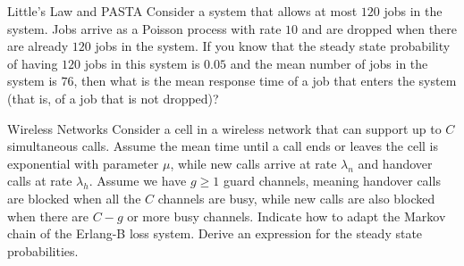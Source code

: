 \begin{problem}{Little's Law and PASTA}
Consider a system that allows at most $120$ jobs in the system. Jobs arrive as a Poisson process with rate $10$ and are dropped when there are already $120$ jobs in the system. If you know that the steady state probability of having $120$ jobs in this system is $0.05$ and the mean number of jobs in the system is $76$, then what is the mean response time of a job that enters the system (that is, of a job that is not dropped)?
\end{problem}

\begin{problem}{Wireless Networks}
Consider a cell in a wireless network that can support up to $C$ simultaneous calls. Assume the mean time until a call ends or leaves the cell is exponential with parameter $\mu$, while new calls arrive at rate $\lambda_n$ and handover calls at rate $\lambda_h$. Assume we have $g \geq 1$ guard channels, meaning handover calls are blocked when all the $C$ channels are busy, while new calls are also blocked when there are $C - g$ or more busy channels. Indicate how to adapt the Markov chain of the Erlang-B loss system. Derive an expression for the steady state probabilities.
\end{problem}